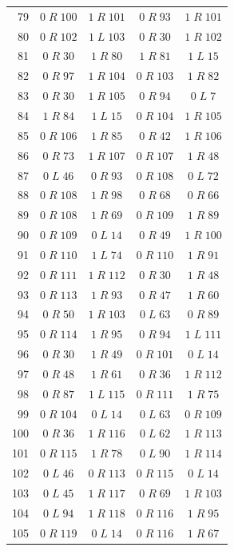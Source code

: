 \begin{longtable}{rcccc}
79 & $0\;R\;100$ & $1\;R\;101$ & $0\;R\;93$ & $1\;R\;101$\\
80 & $0\;R\;102$ & $1\;L\;103$ & $0\;R\;30$ & $1\;R\;102$\\
81 & $0\;R\;30$ & $1\;R\;80$ & $1\;R\;81$ & $1\;L\;15$\\
82 & $0\;R\;97$ & $1\;R\;104$ & $0\;R\;103$ & $1\;R\;82$\\
83 & $0\;R\;30$ & $1\;R\;105$ & $0\;R\;94$ & $0\;L\;7$\\
84 & $1\;R\;84$ & $1\;L\;15$ & $0\;R\;104$ & $1\;R\;105$\\
85 & $0\;R\;106$ & $1\;R\;85$ & $0\;R\;42$ & $1\;R\;106$\\
86 & $0\;R\;73$ & $1\;R\;107$ & $0\;R\;107$ & $1\;R\;48$\\
87 & $0\;L\;46$ & $0\;R\;93$ & $0\;R\;108$ & $0\;L\;72$\\
88 & $0\;R\;108$ & $1\;R\;98$ & $0\;R\;68$ & $0\;R\;66$\\
89 & $0\;R\;108$ & $1\;R\;69$ & $0\;R\;109$ & $1\;R\;89$\\
90 & $0\;R\;109$ & $0\;L\;14$ & $0\;R\;49$ & $1\;R\;100$\\
91 & $0\;R\;110$ & $1\;L\;74$ & $0\;R\;110$ & $1\;R\;91$\\
92 & $0\;R\;111$ & $1\;R\;112$ & $0\;R\;30$ & $1\;R\;48$\\
93 & $0\;R\;113$ & $1\;R\;93$ & $0\;R\;47$ & $1\;R\;60$\\
94 & $0\;R\;50$ & $1\;R\;103$ & $0\;L\;63$ & $0\;R\;89$\\
95 & $0\;R\;114$ & $1\;R\;95$ & $0\;R\;94$ & $1\;L\;111$\\
96 & $0\;R\;30$ & $1\;R\;49$ & $0\;R\;101$ & $0\;L\;14$\\
97 & $0\;R\;48$ & $1\;R\;61$ & $0\;R\;36$ & $1\;R\;112$\\
98 & $0\;R\;87$ & $1\;L\;115$ & $0\;R\;111$ & $1\;R\;75$\\
99 & $0\;R\;104$ & $0\;L\;14$ & $0\;L\;63$ & $0\;R\;109$\\
100 & $0\;R\;36$ & $1\;R\;116$ & $0\;L\;62$ & $1\;R\;113$\\
101 & $0\;R\;115$ & $1\;R\;78$ & $0\;L\;90$ & $1\;R\;114$\\
102 & $0\;L\;46$ & $0\;R\;113$ & $0\;R\;115$ & $0\;L\;14$\\
103 & $0\;L\;45$ & $1\;R\;117$ & $0\;R\;69$ & $1\;R\;103$\\
104 & $0\;L\;94$ & $1\;R\;118$ & $0\;R\;116$ & $1\;R\;95$\\
105 & $0\;R\;119$ & $0\;L\;14$ & $0\;R\;116$ & $1\;R\;67$\\

\end{longtable}
